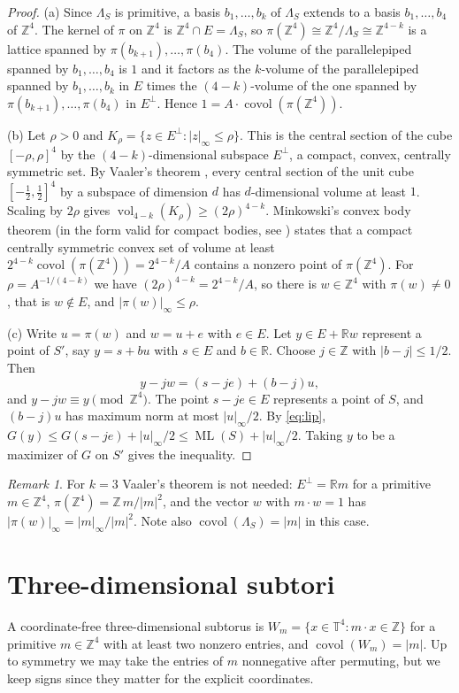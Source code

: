 \documentclass[12pt]{amsart}
\theoremstyle{definition}\newtheorem{definition}[theorem]{Definition}
\theoremstyle{remark}\newtheorem{remark}[theorem]{Remark}
\newcommand{\Z}{\mathbb Z}\newcommand{\R}{\mathbb R}\newcommand{\T}{\mathbb T}
\newcommand{\ML}{\operatorname{ML}}
\newcommand{\covol}{\operatorname{covol}}
\newcommand{\supn}[1]{\lvert #1\rvert_\infty}
\newcommand{\eucl}[1]{\lvert #1\rvert}
\begin{document}
\begin{proof}
(a) Since $\Lambda_S$ is primitive, a basis $b_1,\dots,b_k$ of $\Lambda_S$ extends to a basis $b_1,\dots,b_4$ of $\Z^4$. The kernel of $\pi$ on $\Z^4$ is $\Z^4\cap E=\Lambda_S$, so $\pi(\Z^4)\cong\Z^4/\Lambda_S\cong\Z^{4-k}$ is a lattice spanned by $\pi(b_{k+1}),\dots,\pi(b_4)$. The volume of the parallelepiped spanned by $b_1,\dots,b_4$ is $1$ and it factors as the $k$-volume of the parallelepiped spanned by $b_1,\dots,b_k$ in $E$ times the $(4-k)$-volume of the one spanned by $\pi(b_{k+1}),\dots,\pi(b_4)$ in $E^\perp$. Hence $1=A\cdot\covol(\pi(\Z^4))$.

(b) Let $\rho>0$ and $K_\rho=\{z\in E^\perp:\supn{z}\le\rho\}$. This is the central section of the cube $[-\rho,\rho]^4$ by the $(4-k)$-dimensional subspace $E^\perp$, a compact, convex, centrally symmetric set. By Vaaler's theorem \cite{Vaaler}, every central section of the unit cube $[-\frac12,\frac12]^4$ by a subspace of dimension $d$ has $d$-dimensional volume at least $1$. Scaling by $2\rho$ gives $\operatorname{vol}_{4-k}(K_\rho)\ge(2\rho)^{4-k}$. Minkowski's convex body theorem (in the form valid for compact bodies, see \cite[Chapter~III]{Cassels}) states that a compact centrally symmetric convex set of volume at least $2^{4-k}\covol(\pi(\Z^4))=2^{4-k}/A$ contains a nonzero point of $\pi(\Z^4)$. For $\rho=A^{-1/(4-k)}$ we have $(2\rho)^{4-k}=2^{4-k}/A$, so there is $w\in\Z^4$ with $\pi(w)\ne 0$, that is $w\notin E$, and $\supn{\pi(w)}\le\rho$.

(c) Write $u=\pi(w)$ and $w=u+e$ with $e\in E$. Let $y\in E+\R w$ represent a point of $S'$, say $y=s+bu$ with $s\in E$ and $b\in\R$. Choose $j\in\Z$ with $|b-j|\le 1/2$. Then
\[
 y-jw=(s-je)+(b-j)u,
\]
and $y-jw\equiv y\pmod{\Z^4}$. The point $s-je\in E$ represents a point of $S$, and $(b-j)u$ has maximum norm at most $\supn u/2$. By \eqref{eq:lip}, $G(y)\le G(s-je)+\supn u/2\le\ML(S)+\supn u/2$. Taking $y$ to be a maximizer of $G$ on $S'$ gives the inequality.
\end{proof}

\begin{remark}
For $k=3$ Vaaler's theorem is not needed: $E^\perp=\R m$ for a primitive $m\in\Z^4$, $\pi(\Z^4)=\Z\,m/\eucl m^2$, and the vector $w$ with $m\cdot w=1$ has $\supn{\pi(w)}=\supn m/\eucl m^2$. Note also $\covol(\Lambda_S)=\eucl m$ in this case.
\end{remark}

\section{Three-dimensional subtori}
A coordinate-free three-dimensional subtorus is $W_m=\{x\in\T^4:m\cdot x\in\Z\}$ for a primitive $m\in\Z^4$ with at least two nonzero entries, and $\covol(W_m)=\eucl m$. Up to symmetry we may take the entries of $m$ nonnegative after permuting, but we keep signs since they matter for the explicit coordinates.
\end{document}
